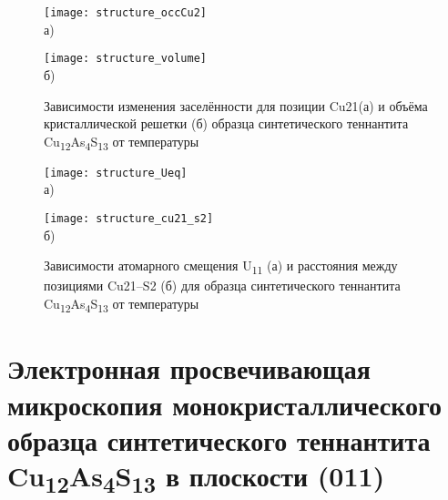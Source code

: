 \begin{figure}[p!]
  \begin{minipage}[ht]{0.9\linewidth}\centering
    \texttt{[image: structure\_occCu2]} \\ а)
  \end{minipage}
  \vfill
  \begin{minipage}[ht]{0.9\linewidth}\centering
    \texttt{[image: structure\_volume]} \\ б)
  \end{minipage}

      \caption[Зависимости изменения заселённости для позиции Cu21(а) и объёма кристаллической решетки (б) образца синтетического теннантита Cu\textsubscript{12}As\textsubscript{4}S\textsubscript{13} от температуры]{Зависимости изменения заселённости для позиции Cu21(а) и объёма кристаллической решетки (б) образца синтетического теннантита Cu\textsubscript{12}As\textsubscript{4}S\textsubscript{13} от температуры}
    \label{img:structure1}
\end{figure}

\begin{figure}[p!]
  \begin{minipage}[ht]{0.9\linewidth}\centering
    \texttt{[image: structure\_Ueq]} \\ а)
  \end{minipage}
  \vfill
  \begin{minipage}[ht]{0.9\linewidth}\centering
    \texttt{[image: structure\_cu21\_s2]} \\ б)
  \end{minipage}

      \caption[Зависимости атомарного смещения U\textsubscript{11} (а) и расстояния между позициями Cu21--S2 (б) для образца синтетического теннантита Cu\textsubscript{12}As\textsubscript{4}S\textsubscript{13} от температуры]{Зависимости атомарного смещения U\textsubscript{11} (а) и расстояния между позициями Cu21--S2 (б) для образца синтетического теннантита Cu\textsubscript{12}As\textsubscript{4}S\textsubscript{13} от температуры}
    \label{img:structure2}
\end{figure}
\newpage

\section{Электронная просвечивающая микроскопия монокристаллического образца синтетического теннантита Cu\textsubscript{12}As\textsubscript{4}S\textsubscript{13} в плоскости (011) } \label{sect3_2}

